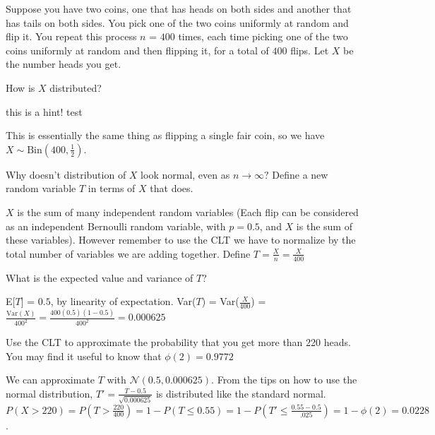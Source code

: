 Suppose you have two coins, one that has heads on both sides and another that has tails on both sides. You pick one of the two coins uniformly at random and flip it. You repeat this process $n$ = $400$ times, each time picking one of the two coins uniformly at random and then flipping it, for a total of $400$ flips. Let $X$ be the number heads you get.

\begin{question}
How is $X$ distributed?

\hint this is a hint!
test

\begin{solution}
This is essentially the same thing as flipping a single fair coin, so we have $X \mathtt{\sim} \mathrm{Bin}(400, \frac{1}{2})$.
\end{solution}
\end{question}

\begin{question}
Why doesn't distribution of $X$ look normal, even as $n \to \infty?$  Define a new random variable $T$ in terms of $X$ that does.

\begin{solution}
$X$ is the sum of many independent random variables (Each flip can be considered as an independent Bernoulli random variable, with $p = 0.5$, and $X$ is the sum of these variables). However remember to use the CLT we have to normalize by the total number of variables we are adding together. Define $T = \frac{X}{n} = \frac{X}{400}$
\end{solution}
\end{question}

\begin{question}
What is the expected value and variance of $T$?

\begin{solution}
E[$T$] = $0.5$, by linearity of expectation. Var($T$) = Var($\frac{X}{400}$)  = $\frac{\text{Var}(X)}{400^2} = \frac{400(0.5)(1-0.5)}{400^2} = 0.000625$
\end{solution}
\end{question}

\begin{question}
Use the CLT to approximate the probability that you get more than 220 heads. You may find it useful to know that $\phi(2) = 0.9772$

\begin{solution}
We can approximate $T$ with $\mathcal{N}(0.5, 0.000625)$. From the tips on how to use the normal distribution, $T' = \frac{T-0.5}{\sqrt{0.000625}}$ is distributed like the standard normal. 
$P(X>220) = P(T>\frac{220}{400}) = 1 - P(T \leq 0.55) = 1 - P(T' \leq \frac{0.55-0.5}{.025}) = 1 - \phi(2) = 0.0228$.
\end{solution}
\end{question}
